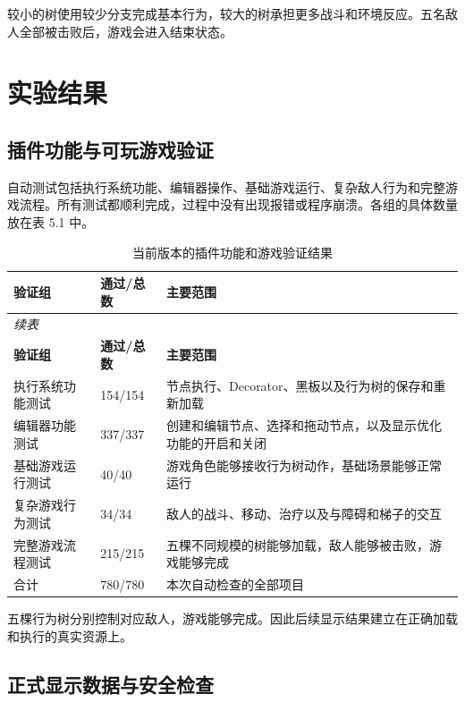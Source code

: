 \documentclass[11pt,a4paper,oneside,extrafontsizes]{memoir}
\begin{document}
较小的树使用较少分支完成基本行为，较大的树承担更多战斗和环境反应。五名敌人全部被击败后，游戏会进入结束状态。

\chapter{实验结果}

\section{插件功能与可玩游戏验证}

自动测试包括执行系统功能、编辑器操作、基础游戏运行、复杂敌人行为和完整游戏流程。所有测试都顺利完成，过程中没有出现报错或程序崩溃。各组的具体数量放在表 5.1 中。


\begin{center}

\begin{longtable}{@{}p{} p{} p{}@{}}
\caption{当前版本的插件功能和游戏验证结果}\label{tab:function-game-validation}\\
\toprule
\textbf{验证组} & \textbf{通过/总数} & \textbf{主要范围} \\
\midrule
\endfirsthead
\multicolumn{3}{l}{\itshape 续表}\\
\toprule
\textbf{验证组} & \textbf{通过/总数} & \textbf{主要范围} \\
\midrule
\endhead
执行系统功能测试 & 154/154 & 节点执行、Decorator、黑板以及行为树的保存和重新加载 \\
编辑器功能测试 & 337/337 & 创建和编辑节点、选择和拖动节点，以及显示优化功能的开启和关闭 \\
基础游戏运行测试 & 40/40 & 游戏角色能够接收行为树动作，基础场景能够正常运行 \\
复杂游戏行为测试 & 34/34 & 敌人的战斗、移动、治疗以及与障碍和梯子的交互 \\
完整游戏流程测试 & 215/215 & 五棵不同规模的树能够加载，敌人能够被击败，游戏能够完成 \\
合计 & 780/780 & 本次自动检查的全部项目 \\
\bottomrule
\end{longtable}
\end{center}

五棵行为树分别控制对应敌人，游戏能够完成。因此后续显示结果建立在正确加载和执行的真实资源上。

\section{正式显示数据与安全检查}
\end{document}
